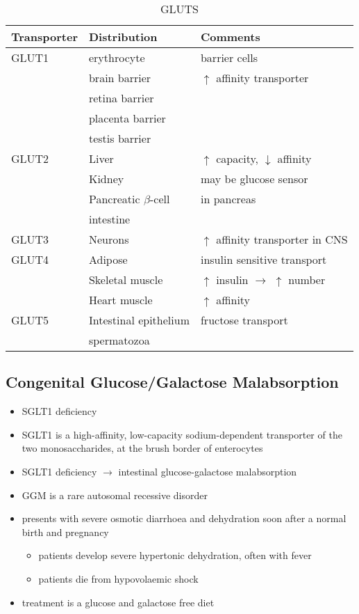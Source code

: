 \documentclass{scrartcl}
\begin{document}
\begin{table}[htbp]
\caption[GLUTS]{\label{tab:org1c022b3}
GLUTS}
\centering
\begin{tabular}{lll}
Transporter & Distribution & Comments\\
\hline
GLUT1 & erythrocyte & barrier cells\\
 & brain barrier & \(\uparrow\) affinity transporter\\
 & retina barrier & \\
 & placenta barrier & \\
 & testis barrier & \\
\hline
GLUT2 & Liver & \(\uparrow\) capacity, \(\downarrow\) affinity\\
 & Kidney & may be glucose sensor\\
 & Pancreatic \(\beta\)-cell & in pancreas\\
 & intestine & \\
\hline
GLUT3 & Neurons & \(\uparrow\) affinity  transporter in CNS\\
\hline
GLUT4 & Adipose & insulin sensitive transport\\
 & Skeletal muscle & \(\uparrow\) insulin \(\to\) \(\uparrow\) number\\
 & Heart muscle & \(\uparrow\) affinity\\
\hline
GLUT5 & Intestinal epithelium & fructose transport\\
 & spermatozoa & \\
\end{tabular}
\end{table}

\subsection{Congenital Glucose/Galactose Malabsorption}
\label{sec:orgf3b76e0}
\begin{itemize}
\item SGLT1 deficiency
\item SGLT1 is a high-affinity, low-capacity sodium-dependent transporter
of the two monosaccharides, at the brush border of enterocytes
\item SGLT1 deficiency \(\to\) intestinal glucose-galactose malabsorption
\item GGM is a rare autosomal recessive disorder
\item presents with severe osmotic diarrhoea and dehydration soon after a
normal birth and pregnancy
\begin{itemize}
\item patients develop severe hypertonic dehydration, often with fever
\item patients die from hypovolaemic shock
\end{itemize}
\item treatment is a glucose and galactose free diet
\end{itemize}
\end{document}
